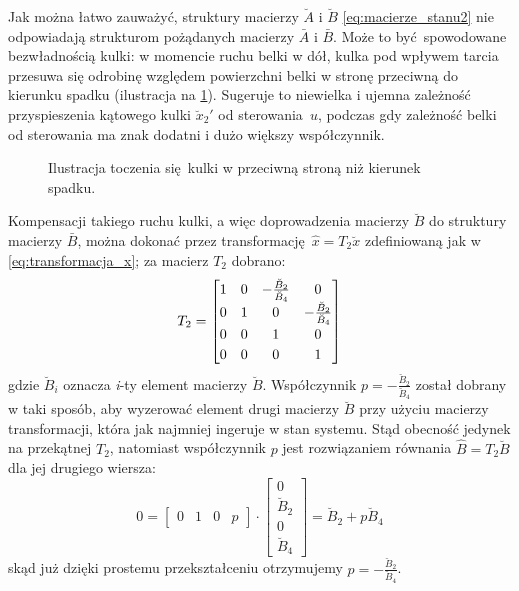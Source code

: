 Jak można łatwo zauważyć, struktury macierzy $\breve{A}$ i $\breve{B}$ \eqref{eq:macierze_stanu2} nie odpowiadają strukturom pożądanych macierzy $\bar{A}$ i $\bar{B}$. Może to być spowodowane bezwładnością kulki: w momencie ruchu belki w dół, kulka pod wpływem tarcia przesuwa się odrobinę względem powierzchni belki w stronę przeciwną do kierunku spadku (ilustracja na \cref{fig:przeciwny_ruch_kulki}). Sugeruje to niewielka i ujemna zależność przyspieszenia kątowego kulki $\breve{x}_2'$ od sterowania~$u$, podczas gdy zależność belki od sterowania ma znak dodatni i dużo większy współczynnik.

\begin{figure}[h]
    \centering
    
    \caption{Ilustracja toczenia się kulki w przeciwną stroną niż kierunek spadku.}
    \label{fig:przeciwny_ruch_kulki}
\end{figure}

Kompensacji takiego ruchu kulki, a więc doprowadzenia macierzy $\breve{B}$ do struktury macierzy $\bar{B}$, można dokonać przez transformację $\hat{x} = T_2 \breve{x}$ zdefiniowaną jak w \eqref{eq:transformacja_x}; za macierz $T_2$ dobrano:
\begin{equation}\label{eq:transformacja2_x}
    \renewcommand\arraystretch{1.2}
    T_2 = \begin{bmatrix}
        1 & 0 & -\frac{\breve{B}_2}{\breve{B}_4} & 0 \\
        0 & 1 & 0 & -\frac{\breve{B}_2}{\breve{B}_4} \\
        0 & 0 & 1 & 0 \\
        0 & 0 & 0 & 1 \\
    \end{bmatrix}
\end{equation}
gdzie $\breve{B}_i$ oznacza \textit{i}-ty element macierzy $\breve{B}$. Współczynnik $p=-\frac{\breve{B}_2}{\breve{B}_4}$ został dobrany w taki sposób, aby wyzerować element drugi macierzy $\breve{B}$ przy użyciu macierzy transformacji, która jak najmniej ingeruje w stan systemu. Stąd obecność jedynek na przekątnej $T_2$, natomiast współczynnik $p$ jest rozwiązaniem równania $\hat{B} = T_2 \breve{B}$ dla jej drugiego wiersza:
\begin{equation*}
0 =
    \begin{bmatrix}
        0 & 1 & 0 & p
    \end{bmatrix} \cdot
    \begin{bmatrix}
        0 \\ \breve{B}_2 \\ 0 \\ \breve{B}_4
    \end{bmatrix}
  = \breve{B}_2 + p \breve{B}_4
\end{equation*}
skąd już dzięki prostemu przekształceniu otrzymujemy $p = -\frac{\breve{B}_2}{\breve{B}_4}$.


